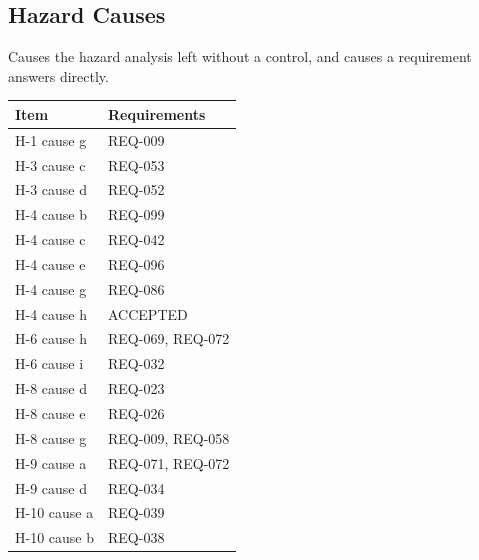 \documentclass[11pt,a4paper]{article}
\begin{document}
\subsection{Hazard Causes}
Causes the hazard analysis left without a control, and causes a requirement
answers directly.

{\footnotesize
\begin{xltabular}{\textwidth}{@{}>{\raggedright\arraybackslash}X>{\raggedright\arraybackslash}p{6.2cm}@{}}
\toprule
Item & Requirements \\
\midrule
\endhead
H-1 cause g & REQ-009 \\
H-3 cause c & REQ-053 \\
H-3 cause d & REQ-052 \\
H-4 cause b & REQ-099 \\
H-4 cause c & REQ-042 \\
H-4 cause e & REQ-096 \\
H-4 cause g & REQ-086 \\
H-4 cause h & ACCEPTED \\
H-6 cause h & REQ-069, REQ-072 \\
H-6 cause i & REQ-032 \\
H-8 cause d & REQ-023 \\
H-8 cause e & REQ-026 \\
H-8 cause g & REQ-009, REQ-058 \\
H-9 cause a & REQ-071, REQ-072 \\
H-9 cause d & REQ-034 \\
H-10 cause a & REQ-039 \\
H-10 cause b & REQ-038 \\
\bottomrule
\end{xltabular}}
\end{document}
